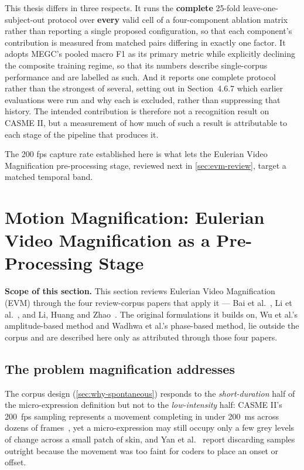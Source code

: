 This thesis differs in three respects. It runs the \textbf{complete} 25-fold leave-one-subject-out protocol over \textbf{every} valid cell of a four-component ablation matrix rather than reporting a single proposed configuration, so that each component's contribution is measured from matched pairs differing in exactly one factor. It adopts MEGC's pooled macro F1 as its primary metric while explicitly declining the composite training regime, so that its numbers describe single-corpus performance and are labelled as such. And it reports one complete protocol rather than the strongest of several, setting out in Section~4.6.7 which earlier evaluations were run and why each is excluded, rather than suppressing that history. The intended contribution is therefore not a recognition result on CASME II, but a measurement of how much of such a result is attributable to each stage of the pipeline that produces it.

The 200 fps capture rate established here is what lets the Eulerian Video Magnification pre-processing stage, reviewed next in \autoref{sec:evm-review}, target a matched temporal band.


\section{Motion Magnification: Eulerian Video Magnification as a Pre-Processing Stage}
\label{sec:evm-review}

\textbf{Scope of this section.} This section reviews Eulerian Video Magnification (EVM) through the four review-corpus papers that apply it --- Bai et al.~\cite{bai2021}, Li et al.~\cite{liX2018}, and Li, Huang and Zhao~\cite{liY2018,liY2021}. The original formulations it builds on, Wu et al.'s amplitude-based method and Wadhwa et al.'s phase-based method, lie outside the corpus and are described here only as attributed through those four papers.

\subsection{The problem magnification addresses}
\label{sec:evm-problem}

The corpus design (\autoref{sec:why-spontaneous}) responds to the \textit{short-duration} half of the micro-expression definition but not to the \textit{low-intensity} half: CASME II's 200~fps sampling represents a movement completing in under 200~ms across dozens of frames~\cite{yan2014}, yet a micro-expression may still occupy only a few grey levels of change across a small patch of skin, and Yan et al.~\cite{yan2014} report discarding samples outright because the movement was too faint for coders to place an onset or offset.

